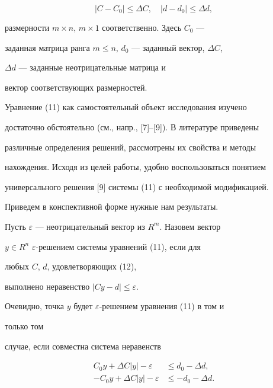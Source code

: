 \begin{equation} 


|C-C_0|\le\Delta C,\quad |d-d_0|\le\Delta d, 


\end{equation} 


размерности $m\times n$, $m\times 1$ соответственно. Здесь $C_0$ --- 


заданная матрица ранга $m\le n$, $d_0$ --- заданный вектор, $\Delta C$, 


$\Delta d$ --- заданные неотрицательные матрица и 


вектор соответствующих размерностей. 


 


Уравнение (11) как самостоятельный объект исследования изучено 


достаточно обстоятельно (см., напр., [7]--[9]). В литературе приведены 


различные определения решений, рассмотрены их свойства и методы 


нахождения. Исходя из целей работы, удобно воспользоваться понятием 


универсального решения [9] системы (11) с необходимой модификацией. 


Приведем в конспективной форме нужные нам результаты. 


 


Пусть $\varepsilon$ --- неотрицательный вектор из $R^m$. Назовем вектор 


$y\in R^n$\; $\varepsilon$-решением системы уравнений (11), если для 


любых $C$, $d$, удовлетворяющих (12), 


выполнено неравенство $|Cy-d|\le\varepsilon$. 


 


Очевидно, точка $y$ будет $\varepsilon$-решением уравнения (11) в том и 


только том 


случае, если совместна система неравенств 


\begin{equation} 


\begin{split} 


C_0y+\Delta C|y|-\varepsilon&\le d_0-\Delta d,\\ 


-C_0y+\Delta C|y|-\varepsilon&\le-d_0-\Delta d. 


\end{split} 


\end{equation} 


